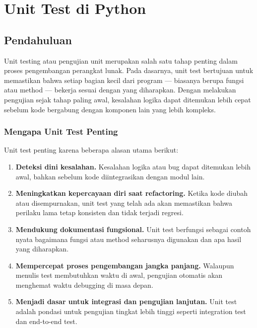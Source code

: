 \chapter{Unit Test di Python}
\label{ch:unit-test-python}


\section{Pendahuluan}

Unit testing atau pengujian unit merupakan salah satu tahap penting dalam proses pengembangan perangkat lunak. Pada dasarnya, unit test bertujuan untuk memastikan bahwa setiap bagian kecil dari program — biasanya berupa fungsi atau method — bekerja sesuai dengan yang diharapkan. Dengan melakukan pengujian sejak tahap paling awal, kesalahan logika dapat ditemukan lebih cepat sebelum kode bergabung dengan komponen lain yang lebih kompleks.

\subsection{Mengapa Unit Test Penting}

Unit test penting karena beberapa alasan utama berikut:

\begin{enumerate}
    \item \textbf{Deteksi dini kesalahan.}  
    Kesalahan logika atau bug dapat ditemukan lebih awal, bahkan sebelum kode diintegrasikan dengan modul lain.
    
    \item \textbf{Meningkatkan kepercayaan diri saat refactoring.}  
    Ketika kode diubah atau disempurnakan, unit test yang telah ada akan memastikan bahwa perilaku lama tetap konsisten dan tidak terjadi regresi.
    
    \item \textbf{Mendukung dokumentasi fungsional.}  
    Unit test berfungsi sebagai contoh nyata bagaimana fungsi atau method seharusnya digunakan dan apa hasil yang diharapkan.
    
    \item \textbf{Mempercepat proses pengembangan jangka panjang.}  
    Walaupun menulis test membutuhkan waktu di awal, pengujian otomatis akan menghemat waktu debugging di masa depan.
    
    \item \textbf{Menjadi dasar untuk integrasi dan pengujian lanjutan.}  
    Unit test adalah pondasi untuk pengujian tingkat lebih tinggi seperti integration test dan end-to-end test.
\end{enumerate}

